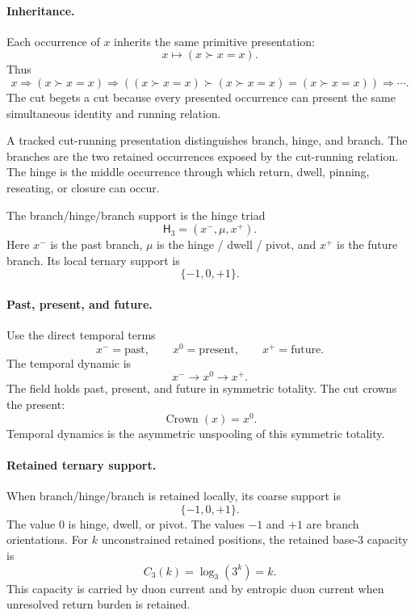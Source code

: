 \paragraph{Inheritance.}
Each occurrence of \(x\) inherits the same primitive presentation:
\[
x\mapsto (x\succ x=x).
\]
Thus
\[
x
\Rightarrow (x\succ x=x)
\Rightarrow ((x\succ x=x)\succ(x\succ x=x)=(x\succ x=x))
\Rightarrow \cdots.
\]
The cut begets a cut because every presented occurrence can present the same simultaneous identity and running relation.

\begin{definition}
A tracked cut-running presentation distinguishes branch, hinge, and branch. The branches are the two retained occurrences exposed by the cut-running relation. The hinge is the middle occurrence through which return, dwell, pinning, reseating, or closure can occur.
\end{definition}

\begin{definition}
The branch/hinge/branch support is the hinge triad
\[
\mathsf H_3=(x^-,\mu,x^+).
\]
Here \(x^-\) is the past branch, \(\mu\) is the hinge / dwell / pivot, and \(x^+\) is the future branch. Its local ternary support is
\[
\{-1,0,+1\}.
\]
\end{definition}

\paragraph{Past, present, and future.}
Use the direct temporal terms
\[
x^- = \text{past},
\qquad
x^0 = \text{present},
\qquad
x^+ = \text{future}.
\]
The temporal dynamic is
\[
x^-\to x^0\to x^+.
\]
The field holds past, present, and future in symmetric totality. The cut crowns the present:
\[
\operatorname{Crown}(x)=x^0.
\]
Temporal dynamics is the asymmetric unspooling of this symmetric totality.

\paragraph{Retained ternary support.}
When branch/hinge/branch is retained locally, its coarse support is
\[
\{-1,0,+1\}.
\]
The value \(0\) is hinge, dwell, or pivot. The values \(-1\) and \(+1\) are branch orientations. For \(k\) unconstrained retained positions, the retained base-3 capacity is
\[
C_3(k)=\log_3(3^k)=k.
\]
This capacity is carried by duon current and by entropic duon current when unresolved return burden is retained.
